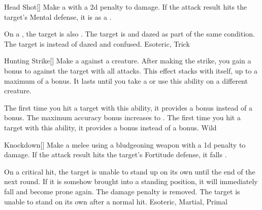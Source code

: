 \lowercase{\hypertarget{maneuver:Head Shot}{}}\label{maneuver:Head Shot}
\hypertarget{maneuver:Head Shot}{}
\begin{freeability}{Head Shot}[]
Make a  with a \minus2d penalty to damage.
If the attack result hits the target's Mental defense,
it is  as a .

\rankline
{} On a , the target is also .
 The target is  and dazed as part of the same condition.
 The target is  instead of dazed and confused.
 Esoteric, Trick
\end{freeability}
\vspace{0.25em}



\lowercase{\hypertarget{maneuver:Hunting Strike}{}}\label{maneuver:Hunting Strike}
\hypertarget{maneuver:Hunting Strike}{}
\begin{freeability}{Hunting Strike}[]
Make a  against a creature.
After making the strike, you gain a  bonus to  against the target with all attacks.
This effect stacks with itself, up to a maximum of a  bonus.
It lasts until you take a  or use this ability on a different creature.

\rankline
{} The first time you hit a target with this ability, it provides a  bonus instead of a  bonus.
 The maximum accuracy bonus increases to .
 The first time you hit a target with this ability, it provides a  bonus instead of a  bonus.
 Wild
\end{freeability}
\vspace{0.25em}



\lowercase{\hypertarget{maneuver:Knockdown}{}}\label{maneuver:Knockdown}
\hypertarget{maneuver:Knockdown}{}
\begin{freeability}{Knockdown}[]
Make a melee  using a bludgeoning weapon with a \minus1d penalty to damage.
If the attack result hits the target's Fortitude defense,
it falls .

\rankline
{} On a critical hit, the target is unable to stand up on its own until the end of the next round.
If it is somehow brought into a standing position, it will immediately fall and become prone again.
 The damage penalty is removed.
 The target is unable to stand on its own after a normal hit.
 Esoteric, Martial, Primal
\end{freeability}
\vspace{0.25em}



